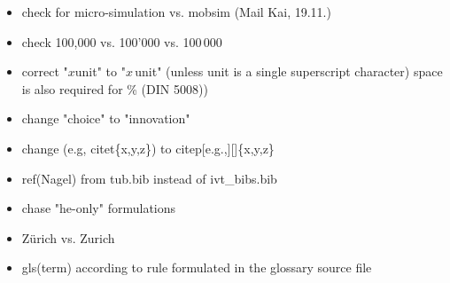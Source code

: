 \begin{itemize}

\item check for micro-simulation vs. mobsim (Mail Kai, 19.11.)

\item check 100,000 vs. 100'000 vs. 100\,000

\item correct "$x$unit" to "$x$\,unit" (unless unit is a single superscript character) space is also required for \% (DIN 5008)) 

\item change "choice" to "innovation"

\item change (e.g, citet\{x,y,z\}) to citep[e.g.,][]\{x,y,z\}

\item ref(Nagel) from tub.bib instead of ivt\_bibs.bib

\item chase "he-only" formulations

\item Zürich vs. Zurich

\item gls(term) according to rule formulated in the glossary source file

\end{itemize}

\vfill\eject

\lstset{language=Java}


\createtitlepage
{}

 \cleardoublepage

{\parskip0pt %
\tableofcontents \cleardoublepage
}

 \cleardoublepage



